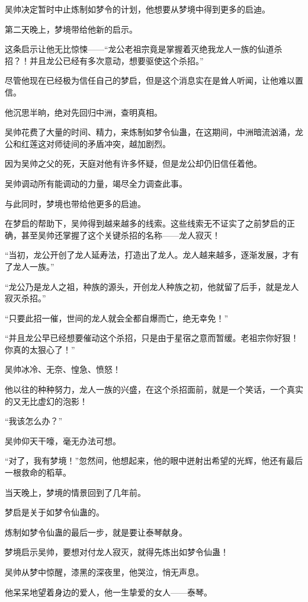 \begin{this_body}
吴帅决定暂时中止炼制如梦令的计划，他想要从梦境中得到更多的启迪。

第二天晚上，梦境带给他新的启示。

这条启示让他无比惊悚——“龙公老祖宗竟是掌握着灭绝我龙人一族的仙道杀招？！并且龙公已经有多次意动，想要驱使这个杀招。”

尽管他现在已经极为信任自己的梦启，但是这个消息实在是耸人听闻，让他难以置信。

他沉思半晌，绝对先回归中洲，查明真相。

吴帅花费了大量的时间、精力，来炼制如梦令仙蛊，在这期间，中洲暗流汹涌，龙公和红莲这对师徒间的矛盾冲突，越加剧烈。

因为吴帅之父的死，天庭对他有许多怀疑，但是龙公却仍旧信任着他。

吴帅调动所有能调动的力量，竭尽全力调查此事。

与此同时，梦境也带给他更多的启迪。

在梦启的帮助下，吴帅得到越来越多的线索。这些线索无不证实了之前梦启的正确，甚至吴帅还掌握了这个关键杀招的名称——龙人寂灭！

“当初，龙公开创了龙人延寿法，打造出了龙人。龙人越来越多，逐渐发展，才有了龙人一族。”

“龙公乃是龙人之祖，种族的源头，开创龙人种族之初，他就留了后手，就是龙人寂灭杀招。”

“只要此招一催，世间的龙人就会全都自爆而亡，绝无幸免！”

“并且龙公早已经想要催动这个杀招，只是由于星宿之意而暂缓。老祖宗你好狠！你真的太狠心了！”

吴帅冰冷、无奈、惶急、愤怒！

他以往的种种努力，龙人一族的兴盛，在这个杀招面前，就是一个笑话，一个真实的又无比虚幻的泡影！

“我该怎么办？”

吴帅仰天干嚎，毫无办法可想。

“对了，我有梦境！”忽然间，他想起来，他的眼中迸射出希望的光辉，他还有最后一根救命的稻草。

当天晚上，梦境的情景回到了几年前。

梦启是关于如梦令仙蛊的。

炼制如梦令仙蛊的最后一步，就是要让泰琴献身。

梦境启示吴帅，要想对付龙人寂灭，就得先炼出如梦令仙蛊！

吴帅从梦中惊醒，漆黑的深夜里，他哭泣，悄无声息。

他呆呆地望着身边的爱人，他一生挚爱的女人——泰琴。


\end{this_body}
